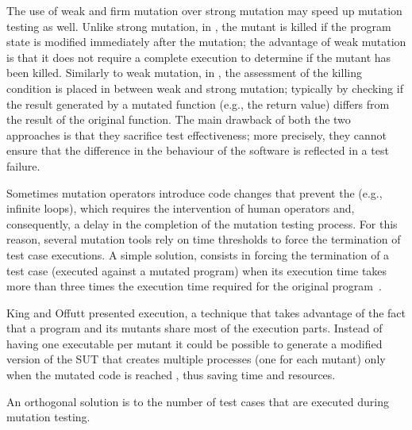 The use of weak and firm mutation over strong mutation may speed up mutation testing as well.
Unlike strong mutation, 
in  \cite{ammann2016introduction}, the mutant is killed if the program state is modified immediately after the mutation; the advantage of weak mutation is that it does not require a complete execution to determine if the mutant has been killed. Similarly to weak mutation, in  \cite{ammann2016introduction}, the assessment of the killing condition is placed in between weak and strong mutation; typically by checking if the result generated by a mutated function (e.g., the return value) differs from the result of the original function. The main drawback of both the two approaches is that they sacrifice test effectiveness; more precisely, they cannot ensure that the difference in the behaviour of the software is reflected in a test failure.


Sometimes mutation operators introduce code changes that prevent the  (e.g., infinite loops), which requires the intervention of human operators and, consequently, a delay in the completion of the mutation testing process.
For this reason, several mutation tools rely on time thresholds to force the termination of test case executions. 
A simple solution, consists in forcing the termination of a test case (executed against a mutated program) when its execution time  takes more than three times the execution time required for the original program~\cite{papadakis2019mutation}.

King and Offutt \cite{king1991fortran} presented  execution, a technique that takes advantage of the fact that a program and its mutants share most of the execution parts. Instead of having one executable per mutant it could be possible to generate a modified version of the SUT that creates multiple processes (one for each mutant) only when the mutated code is reached \cite{tokumoto2016muvm}, thus saving time and resources. 

An orthogonal solution is to  the number of test cases that are executed during mutation testing.

